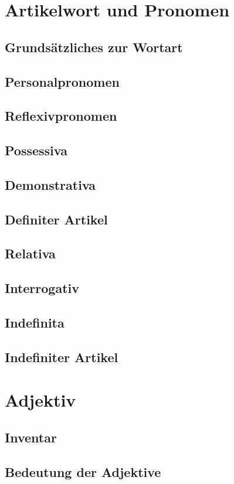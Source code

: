 \documentclass{report}
\begin{document}
	\section{Artikelwort und Pronomen}
		\subsection{Grundsätzliches zur Wortart}
		\subsection{Personalpronomen}
		\subsection{Reflexivpronomen}
		\subsection{Possessiva}
		\subsection{Demonstrativa}
		\subsection{Definiter Artikel}
		\subsection{Relativa}
		\subsection{Interrogativ}
		\subsection{Indefinita}
		\subsection{Indefiniter Artikel}
		
	\section{Adjektiv}
		\subsection{Inventar}
		\subsection{Bedeutung der Adjektive}
\end{document}
